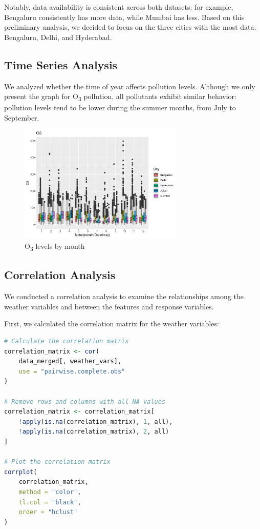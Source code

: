 \documentclass[12pt]{article}
\begin{document}
Notably, data availability is consistent across both datasets: for example, Bengaluru consistently has more data, while Mumbai has less. Based on this preliminary analysis, we decided to focus on the three cities with the most data: Bengaluru, Delhi, and Hyderabad.
\subsection{Time Series Analysis}

We analyzed whether the time of year affects pollution levels. Although we only present the graph for O\textsubscript{3} pollution, all pollutants exhibit similar behavior: pollution levels tend to be lower during the summer months, from July to September.

\begin{figure}[h]
    \centering
    \includegraphics[width=0.7\textwidth]{o3-by-month.png}
    \caption{O\textsubscript{3} levels by month}
    \label{fig:o3_by_month}
\end{figure}

\subsection{Correlation Analysis}

We conducted a correlation analysis to examine the relationships among the weather variables and between the features and response variables.

First, we calculated the correlation matrix for the weather variables:

\begin{lstlisting}[language=R]
# Calculate the correlation matrix
correlation_matrix <- cor(
    data_merged[, weather_vars],
    use = "pairwise.complete.obs"
)

# Remove rows and columns with all NA values
correlation_matrix <- correlation_matrix[
    !apply(is.na(correlation_matrix), 1, all),
    !apply(is.na(correlation_matrix), 2, all)
]

# Plot the correlation matrix
corrplot(
    correlation_matrix,
    method = "color",
    tl.col = "black",
    order = "hclust"
)
\end{lstlisting}
\end{document}
